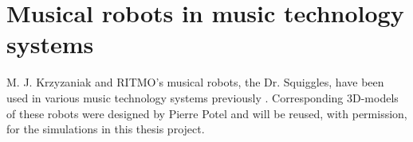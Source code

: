 	
	


\section{Musical robots in music technology systems}

	M. J. Krzyzaniak and RITMO's musical robots, the Dr. Squiggles, have been used in various music technology systems previously \cite{dr_squiggles}. Corresponding 3D-models of these robots were designed by Pierre Potel \cite{pierre_potel} and will be reused, with permission, for the simulations in this thesis project.